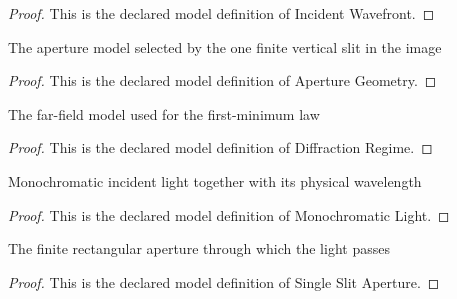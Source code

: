 \begin{proof}
  This is the declared model definition of Incident Wavefront.
\end{proof}
\begin{definition}
  \label{def:physics:phyx-mini-0126:phyxminiproblems-problemphyxmini0126-aperturegeometry}
  The aperture model selected by the one finite vertical slit in the image
\end{definition}
\begin{proof}
  This is the declared model definition of Aperture Geometry.
\end{proof}
\begin{definition}
  \label{def:physics:phyx-mini-0126:phyxminiproblems-problemphyxmini0126-diffractionregime}
  The far-field model used for the first-minimum law
\end{definition}
\begin{proof}
  This is the declared model definition of Diffraction Regime.
\end{proof}
\begin{definition}
  \label{def:physics:phyx-mini-0126:phyxminiproblems-problemphyxmini0126-monochromaticlight}
  Monochromatic incident light together with its physical wavelength
\end{definition}
\begin{proof}
  This is the declared model definition of Monochromatic Light.
\end{proof}
\begin{definition}
  \label{def:physics:phyx-mini-0126:phyxminiproblems-problemphyxmini0126-singleslitaperture}
  The finite rectangular aperture through which the light passes
\end{definition}
\begin{proof}
  This is the declared model definition of Single Slit Aperture.
\end{proof}
